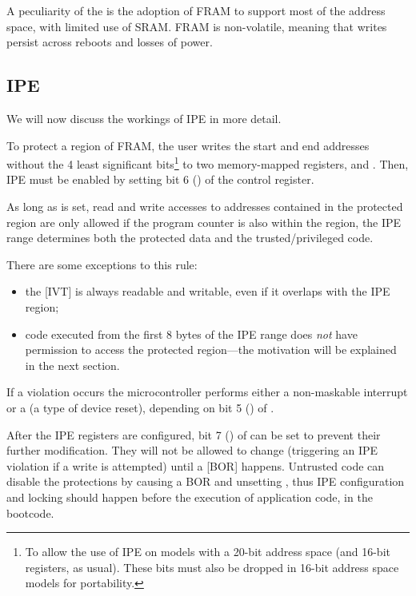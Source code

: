 A peculiarity of the \msp is the adoption of FRAM \cite{slaa628b} to support most of the address space, with limited use of SRAM. FRAM is non-volatile, meaning that writes persist across reboots and losses of power.

\subsection{IPE}
\label{sec:ipe}

We will now discuss the workings of IPE in more detail.

To protect a region of FRAM, the user writes the start and end addresses without the 4 least significant bits\footnote{To allow the use of IPE on models with a 20-bit address space (and 16-bit registers, as usual). These bits must also be dropped in 16-bit address space models for portability.} to two memory-mapped registers,  and . Then, IPE must be enabled by setting bit 6 () of the  control register.

As long as  is set, read and write accesses to addresses contained in the protected region are only allowed if the program counter is also within the region, \ie the IPE range determines both the protected data and the trusted/privileged code.

There are some exceptions to this rule:
\begin{itemize}
\item the [IVT] is always readable and writable, even if it overlaps with the IPE region; %
\item code executed from the first 8 bytes of the IPE range does \emph{not} have permission to access the protected region---the motivation will be explained in the next section.
\end{itemize}

If a violation occurs the microcontroller performs either a non-maskable interrupt or a  (a type of device reset), depending on bit 5 () of .

After the IPE registers are configured, bit 7 () of  can be set to prevent their further modification. They will not be allowed to change (triggering an IPE violation if a write is attempted) until a [BOR] happens.
Untrusted code can disable the protections by causing a BOR and unsetting , thus IPE configuration and locking should happen before the execution of application code, \ie in the bootcode.


